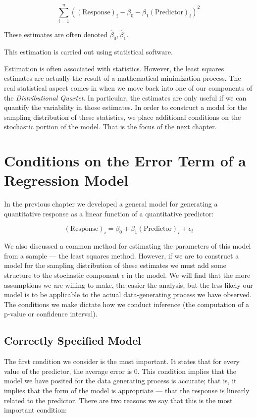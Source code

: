 \documentclass[]{book}
\theoremstyle{plain}
\theoremstyle{mydefn}
\theoremstyle{myexmpl}
\theoremstyle{remark}
\begin{document}
\[\sum_{i=1}^n \left((\text{Response})_i - \beta_0 - \beta_1(\text{Predictor})_{i}\right)^2\]

These estimates are often denoted
\(\widehat{\beta}_0, \widehat{\beta}_1\).

This estimation is carried out using statistical software.

Estimation is often associated with statistics. However, the least
squares estimates are actually the result of a mathematical minimization
process. The real statistical aspect comes in when we move back into one
of our components of the \emph{Distributional Quartet}. In particular,
the estimates are only useful if we can quantify the variability in
those estimates. In order to construct a model for the sampling
distribution of these statistics, we place additional conditions on the
stochastic portion of the model. That is the focus of the next chapter.

\chapter{Conditions on the Error Term of a Regression
Model}\label{Regconditions}

In the previous chapter we developed a general model for generating a
quantitative response as a linear function of a quantitative predictor:

\[(\text{Response})_i = \beta_0 + \beta_1 (\text{Predictor})_{i} + \epsilon_i\]

We also discussed a common method for estimating the parameters of this
model from a sample --- the least squares method. However, if we are to
construct a model for the sampling distribution of these estimates we
must add some structure to the stochastic component \(\epsilon\) in the
model. We will find that the more assumptions we are willing to make,
the easier the analysis, but the less likely our model is to be
applicable to the actual data-generating process we have observed. The
conditions we make dictate how we conduct inference (the computation of
a p-value or confidence interval).

\section{Correctly Specified Model}\label{correctly-specified-model}

The first condition we consider is the most important. It states that
for every value of the predictor, the average error is 0. This condition
implies that the model we have posited for the data generating process
is accurate; that is, it implies that the form of the model is
appropriate --- that the response is linearly related to the predictor.
There are two reasons we say that this is the most important condition:
\end{document}
